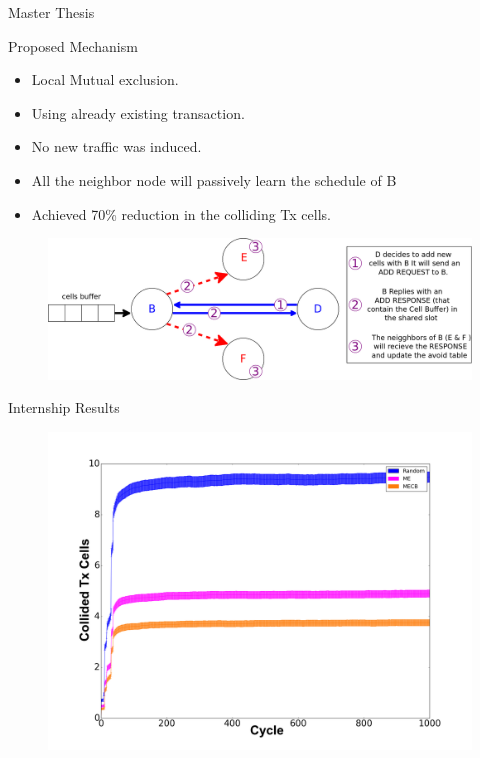 \documentclass{beamer}
\begin{document}
\begin{frame}{Master Thesis}

\begin{block}{Proposed Mechanism}
    \begin{itemize}
    \item Local Mutual exclusion.  
    \item<2-> Using already existing transaction. 
     \item<3-> No new traffic was induced. 
     \item<4-> All the neighbor node will passively learn the schedule of B
      \item<5-> Achieved 70\% reduction in the colliding Tx cells. 
    \end{itemize}
    \end{block}


\centering
\begin{figure}[ht]

\item<2-> \includegraphics[width=.85\linewidth]{collision.png}

\end{figure}
\end{frame}

\begin{frame}{Internship Results}


\begin{figure}[ht]


 \includegraphics[width=.9\linewidth]{Graph2.png}
\end{figure}


 
\end{frame}
\end{document}
